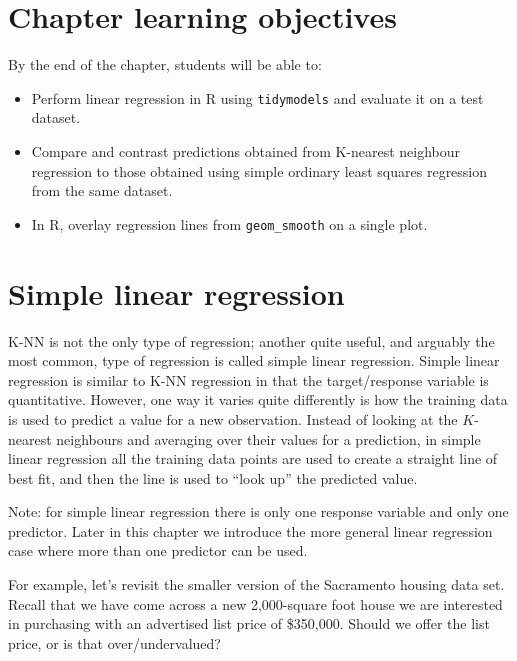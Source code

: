\documentclass[
]{krantz}
\providecommand{\tightlist}{%
  \setlength{\itemsep}{0pt}\setlength{\parskip}{0pt}}
\renewenvironment{quote}{\begin{VF}}{\end{VF}}
\begin{document}
\hypertarget{chapter-learning-objectives-8}{%
\section{Chapter learning objectives}\label{chapter-learning-objectives-8}}

By the end of the chapter, students will be able to:

\begin{itemize}
\tightlist
\item
  Perform linear regression in R using \texttt{tidymodels} and evaluate it on a test dataset.
\item
  Compare and contrast predictions obtained from K-nearest neighbour regression to those obtained using simple ordinary least squares regression from the same dataset.
\item
  In R, overlay regression lines from \texttt{geom\_smooth} on a single plot.
\end{itemize}

\hypertarget{simple-linear-regression}{%
\section{Simple linear regression}\label{simple-linear-regression}}

K-NN is not the only type of regression; another
quite useful, and arguably the most common, type of regression is
called simple linear regression. Simple
linear regression is similar to K-NN regression in that the target/response
variable is quantitative. However, one way it varies quite
differently is how the training data is used to predict a value for a new
observation. Instead of looking at the \(K\)-nearest neighbours and averaging
over their values for a prediction, in simple linear regression all the
training data points are used to create a straight line of best fit, and then
the line is used to ``look up'' the predicted value.

\begin{quote}
Note: for simple linear
regression there is only one response variable and only one predictor. Later in
this chapter we introduce the more general linear regression case where more
than one predictor can be used.
\end{quote}

For example, let's revisit the smaller version of the Sacramento housing data
set. Recall that we have come across a new 2,000-square foot house we are interested
in purchasing with an advertised list price of
\$350,000. Should we offer the list price, or is that over/undervalued?
\end{document}
